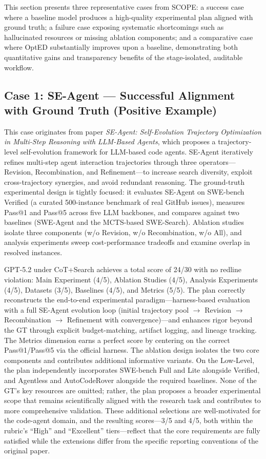 This section presents three representative cases from \textsc{SCOPE}: a success case where a baseline model produces a high-quality experimental plan aligned with ground truth; a failure case exposing systematic shortcomings such as hallucinated resources or missing ablation components; and a comparative case where OptED substantially improves upon a baseline, demonstrating both quantitative gains and transparency benefits of the stage-isolated, auditable workflow.

\subsection{Case 1: SE-Agent --- Successful Alignment with Ground Truth (Positive Example)}

This case originates from paper \textit{SE-Agent: Self-Evolution Trajectory Optimization in Multi-Step Reasoning with LLM-Based Agents}\cite{guo2026se}, which proposes a trajectory-level self-evolution framework for LLM-based code agents. SE-Agent iteratively refines multi-step agent interaction trajectories through three operators---Revision, Recombination, and Refinement---to increase search diversity, exploit cross-trajectory synergies, and avoid redundant reasoning. The ground-truth experimental design is tightly focused: it evaluates SE-Agent on SWE-bench Verified (a curated 500-instance benchmark of real GitHub issues), measures Pass@1 and Pass@5 across five LLM backbones, and compares against two baselines (SWE-Agent and the MCTS-based SWE-Search). Ablation studies isolate three components (w/o Revision, w/o Recombination, w/o All), and analysis experiments sweep cost-performance tradeoffs and examine overlap in resolved instances.

 GPT-5.2 under CoT+Search achieves a total score of 24/30 with no redline violation: Main Experiment (4/5), Ablation Studies (4/5), Analysis Experiments (4/5), Datasets (3/5), Baselines (4/5), and Metrics (5/5). The plan correctly reconstructs the end-to-end experimental paradigm---harness-based evaluation with a full SE-Agent evolution loop (initial trajectory pool $\rightarrow$ Revision $\rightarrow$ Recombination $\rightarrow$ Refinement with convergence)---and enhances rigor beyond the GT through explicit budget-matching, artifact logging, and lineage tracking. The Metrics dimension earns a perfect score by centering on the correct Pass@1/Pass@5 via the official harness. The ablation design isolates the two core components and contributes additional informative variants. On the Low-Level, the plan independently incorporates SWE-bench Full and Lite alongside Verified, and Agentless and AutoCodeRover alongside the required baselines. None of the GT's key resources are omitted; rather, the plan proposes a broader experimental scope that remains scientifically aligned with the research task and contributes to more comprehensive validation. These additional selections are well-motivated for the code-agent domain, and the resulting scores---3/5 and 4/5, both within the rubric's ``High'' and ``Excellent'' tiers---reflect that the core requirements are fully satisfied while the extensions differ from the specific reporting conventions of the original paper.

